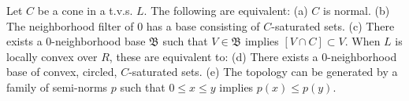 Let $C$ be a cone in a t.v.s. $L$. The following are equivalent: (a) $C$ is normal. (b) The neighborhood filter of 0 has a base consisting of $C$-saturated sets. (c) There exists a 0-neighborhood base $\mathfrak{B}$ such that $V \in \mathfrak{B}$ implies $[V \cap C] \subset V$. When $L$ is locally convex over $R$, these are equivalent to: (d) There exists a 0-neighborhood base of convex, circled, $C$-saturated sets. (e) The topology can be generated by a family of semi-norms $p$ such that $0 \leq x \leq y$ implies $p(x) \leq p(y)$.
